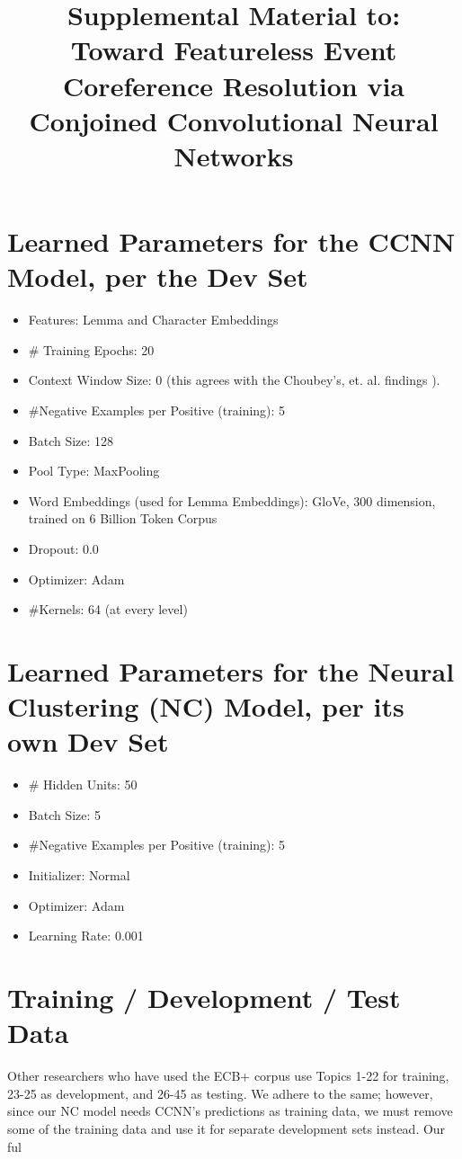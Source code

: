 \documentclass[11pt,a4paper]{article}
\title{Supplemental Material to: \\
Toward Featureless Event Coreference Resolution via Conjoined Convolutional Neural Networks}
\begin{document}
\maketitle

\section{Learned Parameters for the CCNN Model, per the Dev Set}
\begin{itemize}
\item Features: Lemma and Character Embeddings
\item \# Training Epochs: 20
\item Context Window Size: 0 (this agrees with the Choubey's, et. al. findings ).
\item \#Negative Examples per Positive (training): 5
\item Batch Size: 128
\item Pool Type: MaxPooling
\item Word Embeddings (used for Lemma Embeddings): GloVe, 300 dimension, trained on 6 Billion Token Corpus
\item Dropout: 0.0
\item Optimizer: Adam
\item \#Kernels: 64 (at every level)
\end{itemize}

\section{Learned Parameters for the Neural Clustering (NC) Model, per its own Dev Set}
\begin{itemize}
\item \# Hidden Units: 50
\item Batch Size: 5
\item \#Negative Examples per Positive (training): 5
\item Initializer: Normal
\item Optimizer: Adam
\item Learning Rate: 0.001
\end{itemize}

\section{Training / Development / Test Data}
Other researchers who have used the ECB+ corpus use Topics 1-22 for training, 23-25 as development, and 26-45 as testing.  We adhere to the same; however, since our NC model needs CCNN's predictions as training data, we must remove some of the training data and use it for separate development sets instead.  Our ful


\end{document}
